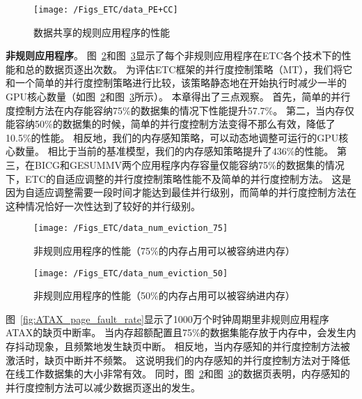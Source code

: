 \begin{figure}[htbp] %
  \centering
  \texttt{[image: /Figs\_ETC/data\_PE+CC]}
  \caption{数据共享的规则应用程序的性能}
  \label{fig:data_PE+CC}
\end{figure}


\textbf{非规则应用程序}。
图~\ref{fig:data_num_eviction_75}和图~\ref{fig:data_num_eviction_50}显示了每个非规则应用程序在ETC各个技术下的性能和总的数据页逐出次数。
为评估ETC框架的并行度控制策略（MT），我们将它和一个简单的并行度控制策略进行比较，该策略静态地在开始执行时减少一半的GPU核心数量（如图~\ref{fig:data_num_eviction_75}和图~\ref{fig:data_num_eviction_50}所示）。
本章得出了三点观察。
首先，简单的并行度控制方法在内存能容纳75\%的数据集的情况下性能提升57.7\%。
第二，当内存仅能容纳50\%的数据集的时候，简单的并行度控制方法变得不那么有效，降低了10.5\%的性能。
相反地，我们的内存感知策略，可以动态地调整可运行的GPU核心数量。
相比于当前的基准模型，我们的内存感知策略提升了436\%的性能。
第三，在BICG和GESUMMV两个应用程序内存容量仅能容纳75\%的数据集的情况下，ETC的自适应调整的并行度控制策略性能不及简单的并行度控制方法。
这是因为自适应调整需要一段时间才能达到最佳并行级别，而简单的并行度控制方法在这种情况恰好一次性达到了较好的并行级别。



\begin{figure}[htbp] %
  \centering
  \texttt{[image: /Figs\_ETC/data\_num\_eviction\_75]}
  \caption{非规则应用程序的性能（75\%的内存占用可以被容纳进内存）}
  \label{fig:data_num_eviction_75}
\end{figure}

\begin{figure}[htbp] %
  \centering
  \texttt{[image: /Figs\_ETC/data\_num\_eviction\_50]}
  \caption{非规则应用程序的性能（50\%的内存占用可以被容纳进内存）}
  \label{fig:data_num_eviction_50}
\end{figure}

图~\ref{fig:ATAX_page_fault_rate}显示了1000万个时钟周期里非规则应用程序ATAX的缺页中断率。
当内存超额配置且75\%的数据集能存放于内存中，会发生内存抖动现象，且频繁地发生缺页中断。
相反地，当内存感知的并行度控制方法被激活时，缺页中断并不频繁。
这说明我们的内存感知的并行度控制方法对于降低在线工作数据集的大小非常有效。
同时，图~\ref{fig:data_num_eviction_75}和图~\ref{fig:data_num_eviction_50}的数据页表明，内存感知的并行度控制方法可以减少数据页逐出的发生。


